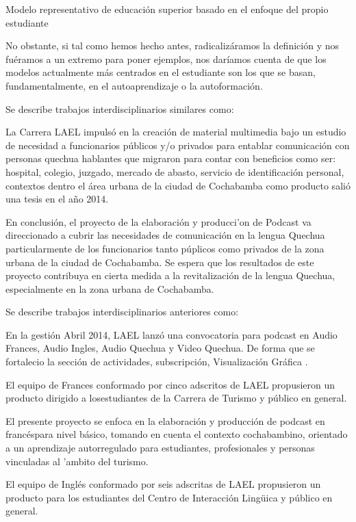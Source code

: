 Modelo representativo de educaci\'{o}n superior basado en el enfoque del propio estudiante

No obstante, si tal como hemos hecho antes, radicaliz\'{a}ramos la definici\'{o}n y nos fu\'{e}ramos a un extremo para poner
ejemplos, nos dar\'{i}amos cuenta de que los modelos actualmente m\'{a}s centrados en el estudiante son los que se basan, 
fundamentalmente, en el autoaprendizaje o la autoformaci\'{o}n.\cite{duart2000aprender}

Se describe trabajos interdisciplinarios similares como: 

La Carrera LAEL impuls\'{o} en la creaci\'{o}n de material multimedia bajo un estudio de necesidad a funcionarios 
públicos y/o privados para entablar comunicaci\'{o}n con personas quechua hablantes que migraron para contar con
beneficios como ser: hospital, colegio, juzgado, mercado de abasto, servicio de identificación personal, 
contextos dentro el área urbana de la ciudad de Cochabamba como producto salió una tesis en el año 2014.

En conclusi\'{o}n, el proyecto de la elaboraci\'{o}n y producci'{o}n de Podcast va direccionado a cubrir
las necesidades de comunicaci\'{o}n en la lengua Quechua particularmente de los funcionarios tanto p\'{u}plicos
como privados de la zona urbana de la ciudad de Cochabamba. Se espera que los resultados de este proyecto contribuya
en cierta medida a la revitalizaci\'{o}n de la lengua Quechua, especialmente en la zona urbana de Cochabamba.\cite{CHLMV2014}

Se describe trabajos interdisciplinarios anteriores como:

En la gesti\'{o}n Abril 2014, LAEL lanz\'{o} una convocatoria para podcast en Audio Frances, Audio Ingles, Audio Quechua y 
Video Quechua. De forma que se fortalecio la secci\'{o}n de actividades, subscripci\'{o}n, Visualizaci\'{o}n Gr\'{a}fica .

El equipo de Frances conformado por cinco adscritos de LAEL propusieron un producto dirigido a losestudiantes de la 
Carrera de Turismo y público en general.

El presente proyecto se enfoca en la elaboraci\'{o}n y producci\'{o}n de podcast en franc\'{e}spara nivel b\'{a}sico,
tomando en cuenta el contexto cochabambino, orientado a un aprendizaje autorregulado para estudiantes, profesionales y
personas vinculadas al '{a}mbito del turismo. \cite{CMNPZ2015}

El equipo de Ingl\'{e}s conformado por seis adscritas de LAEL propusieron un producto para los estudiantes del
Centro de Interacci\'{o}n Ling\"{u}ica y p\'{u}blico en general.

